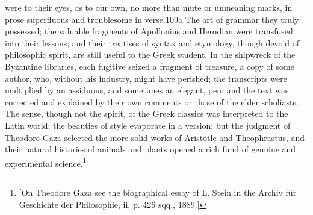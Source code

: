 were to their eyes, as to our own, no more than mute or unmeaning marks, in prose superfluous and troublesome in verse.109a The art of grammar they truly possessed; the valuable fragments of Apollonius and Herodian were transfused into their lessons; and their treatises of syntax and etymology, though devoid of philosophic spirit, are still useful to the Greek student. In the shipwreck of the Byzantine libraries, each fugitive seized a fragment of treasure, a copy of some author, who, without his industry, might have perished; the transcripts were multiplied by an assiduous, and sometimes an elegant, pen; and the text was corrected and explained by their own comments or those of the elder scholiasts. The sense, though not the spirit, of the Greek classics was interpreted to the Latin world; the beauties of style evaporate in a version; but the judgment of Theodore Gaza selected the more solid works of Aristotle and Theophrastus, and their natural histories of animals and plants opened a rich fund of genuine and experimental science.\footnote{[On Theodore Gaza see the biographical essay of L. Stein in the Archiv für Geschichte der Philosophie, ii. p. 426 sqq., 1889.]}

